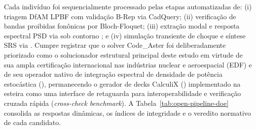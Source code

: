 Cada indivíduo foi sequencialmente processado pelas etapas automatizadas de: (i) triagem DfAM LPBF com validação B-Rep via CadQuery; (ii) verificação de bandas proibidas fonônicas por Bloch-Floquet; (iii) extração modal e resposta espectral PSD via  sob contorno ; e (iv) simulação transiente de choque e síntese SRS via . Cumpre registrar que o solver Code\_Aster foi deliberadamente priorizado como o solucionador estrutural principal deste estudo em virtude de sua ampla certificação internacional nas indústrias nuclear e aeroespacial (EDF) e de seu operador nativo de integração espectral de densidade de potência estocástica (), permanecendo o gerador de decks CalculiX () implementado na esteira como uma interface de retaguarda para interoperabilidade e verificação cruzada rápida (\textit{cross-check benchmark}). A Tabela~\ref{tab:open-pipeline-doe} consolida as respostas dinâmicas, os índices de integridade e o veredito normativo de cada candidato.

